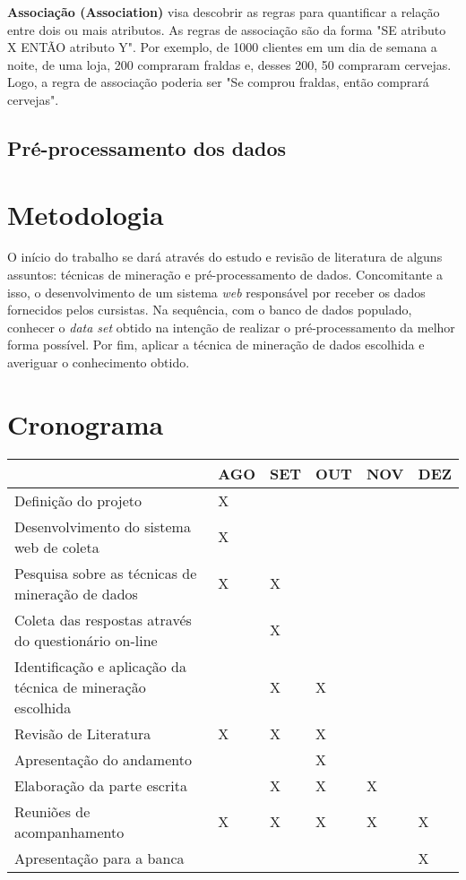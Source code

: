 \documentclass[projtg]{mdtufsm}
\begin{document}
\textbf{Associação (Association)} visa descobrir as regras para quantificar a relação entre dois ou mais atributos. As regras de associação são da forma "SE atributo X ENTÃO atributo Y". Por exemplo, de 1000 clientes em um dia de semana a noite, de uma loja, 200 compraram fraldas e, desses 200, 50 compraram cervejas. Logo, a regra de associação poderia ser "Se comprou fraldas, então comprará cervejas".


\section{Pré-processamento dos dados}








\chapter{Metodologia}
O início do trabalho se dará através do estudo e revisão de literatura de alguns assuntos: técnicas de mineração e pré-processamento de dados. Concomitante a isso, o desenvolvimento de um sistema {\it web} responsável por receber os dados fornecidos pelos cursistas. Na sequência, com o banco de dados populado, conhecer o \textit{data set} obtido na intenção de realizar o pré-processamento da melhor forma possível. Por fim, aplicar a técnica de mineração de dados escolhida e averiguar o conhecimento obtido. 
    
\chapter{Cronograma}
\begin{tabu} to 0.9\linewidth{|X[6]|X|X|X|X|X|}
	\hline
	& AGO & SET & OUT & NOV & DEZ \\
	\hline
	Definição do projeto & X & & & & \\
	\hline
	Desenvolvimento do sistema web de coleta & X & & & & \\
	\hline
	Pesquisa sobre as técnicas de mineração de dados & X & X & & & \\
	\hline
	Coleta das respostas através do questionário on-line & & X & & & \\
	\hline
	Identificação e aplicação da técnica de mineração escolhida & & X & X & & \\
	\hline
	Revisão de Literatura & X & X & X & & \\
	\hline
	Apresentação do andamento & & & X & & \\
	\hline
	Elaboração da parte escrita & & X & X & X & \\
	\hline
	Reuniões de acompanhamento & X & X & X & X & X \\
	\hline
	Apresentação para a banca & & & & & X \\
	\hline
\end{tabu}
 
\setlength{\baselineskip}{\baselineskip}



\end{document}
